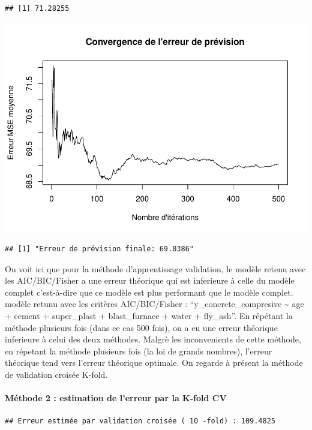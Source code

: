\documentclass[
  12pt,
]{article}
\begin{document}
\begin{verbatim}
## [1] 71.28255
\end{verbatim}

\includegraphics{rmd_final_files/figure-latex/unnamed-chunk-50-1.pdf}

\begin{verbatim}
## [1] "Erreur de prévision finale: 69.0386"
\end{verbatim}

On voit ici que pour la méthode d'apprentissage validation, le modèle
retenu avec les AIC/BIC/Fisher a une erreur théorique qui est inferieure
à celle du modèle complet c'est-à-dire que ce modèle est plus performant
que le modèle complet. modèle retunu avec les critères AIC/BIC/Fisher :
``y\_concrete\_compresive \textasciitilde{} age + cement + super\_plast
+ blast\_furnace + water + fly\_ash''. En répétant la méthode plusieurs
fois (dans ce cas 500 fois), on a eu une erreur théorique inferieure à
celui des deux méthodes. Malgrè les inconvenients de cette méthode, en
répetant la méthode plusieurs fois (la loi de grands nombres), l'erreur
théorique tend vers l'erreur théorique optimale. On regarde à présent la
méthode de validation croisée K-fold.

\paragraph{Méthode 2 : estimation de l'erreur par la K-fold
CV}\label{muxe9thode-2-estimation-de-lerreur-par-la-k-fold-cv}

\begin{verbatim}
## Erreur estimée par validation croisée ( 10 -fold) : 109.4825
\end{verbatim}
\end{document}
